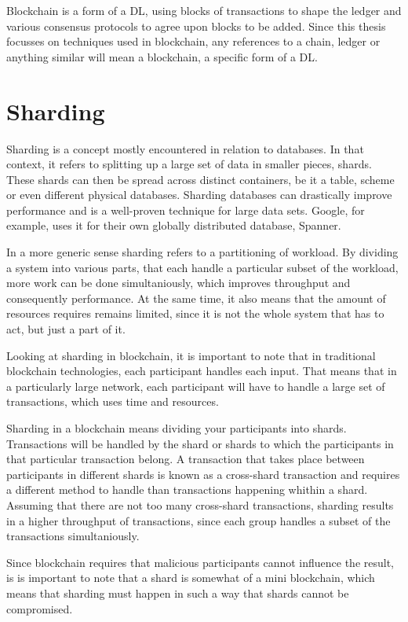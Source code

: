 \documentclass[12pt]{report}
\theoremstyle{plain}
\theoremstyle{definition}
\begin{document}
	Blockchain is a form of a DL, using blocks of transactions to shape the ledger and various consensus protocols to agree upon blocks to be added. Since this thesis focusses on techniques used in blockchain, any references to a chain, ledger or anything similar will mean a blockchain, a specific form of a DL.
	
	\section{Sharding}
	Sharding is a concept mostly encountered in relation to databases. In that context, it refers to splitting up a large set of data in smaller pieces, shards. These shards can then be spread across distinct containers, be it a table, scheme or even different physical databases. Sharding databases can drastically improve performance and is a well-proven technique for large data sets. Google, for example, uses it for their own globally distributed database, Spanner\cite{spanner}.
	
	In a more generic sense sharding refers to a partitioning of workload. By dividing a system into various parts, that each handle a particular subset of the workload, more work can be done simultaniously, which improves throughput and consequently performance. At the same time, it also means that the amount of resources requires remains limited, since it is not the whole system that has to act, but just a part of it.
	
	Looking at sharding in blockchain\cite{omniledger}, it is important to note that in traditional blockchain technologies, each participant handles each input. That means that in a particularly large network, each participant will have to handle a large set of transactions, which uses time and resources.
	
	Sharding in a blockchain means dividing your participants into shards. Transactions will be handled by the shard or shards to which the participants in that particular transaction belong. A transaction that takes place between participants in different shards is known as a cross-shard transaction and requires a different method to handle than transactions happening whithin a shard. Assuming that there are not too many cross-shard transactions, sharding results in a higher throughput of transactions, since each group handles a subset of the transactions simultaniously.
	
	Since blockchain requires that malicious participants cannot influence the result, is is important to note that a shard is somewhat of a mini blockchain, which means that sharding must happen in such a way that shards cannot be compromised.
	
\end{document}
